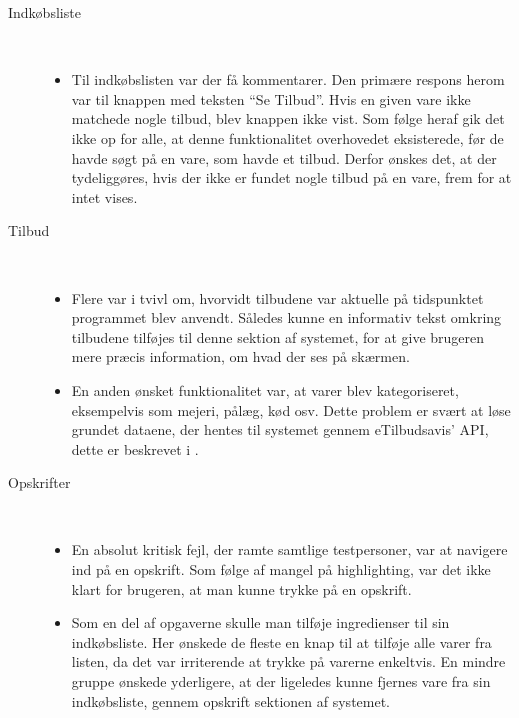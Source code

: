 \begin{description}
   \item[Indkøbsliste]\hfill\\
   \vspace{-15pt}
   	\begin{itemize}[nolistsep, noitemsep]
   	\item Til indkøbslisten var der få kommentarer.
   	Den primære respons herom var til knappen med teksten ``Se Tilbud''. 
   	Hvis en given vare ikke matchede nogle tilbud, blev knappen ikke vist. 
   	Som følge heraf gik det ikke op for alle, at denne funktionalitet overhovedet eksisterede, før de havde søgt på en vare, som havde et tilbud. 
   	Derfor ønskes det, at der tydeliggøres, hvis der ikke er fundet nogle tilbud på en vare, frem for at intet vises.
   	\end{itemize}
   \item[Tilbud]\hfill\\
   \vspace{-15pt}
   	\begin{itemize}[nolistsep, noitemsep]
   	\item Flere var i tvivl om, hvorvidt tilbudene var aktuelle på tidspunktet programmet blev anvendt. 
   	Således kunne en informativ tekst omkring tilbudene tilføjes til denne sektion af systemet, for at give brugeren mere præcis information, om hvad der ses på skærmen.
	\item En anden ønsket funktionalitet var, at varer blev kategoriseret, eksempelvis som mejeri, pålæg, kød osv. 
	Dette problem er svært at løse grundet dataene, der hentes til systemet gennem eTilbudsavis' API, dette er beskrevet i .
	\end{itemize}
   \item[Opskrifter]\hfill\\
   \vspace{-15pt}
   	\begin{itemize}[nolistsep, noitemsep]
	\item En absolut kritisk fejl, der ramte samtlige testpersoner, var at navigere ind på en opskrift. 
	Som følge af mangel på highlighting, var det ikke klart for brugeren, at man kunne trykke på en opskrift.   									\item Som en del af opgaverne skulle man tilføje ingredienser til sin indkøbsliste.
	Her ønskede de fleste en knap til at tilføje alle varer fra listen, da det var irriterende at trykke på varerne enkeltvis.
   	En mindre gruppe ønskede yderligere, at der ligeledes kunne fjernes vare fra sin indkøbsliste, gennem opskrift sektionen af systemet.

\end{itemize}
\end{description}
